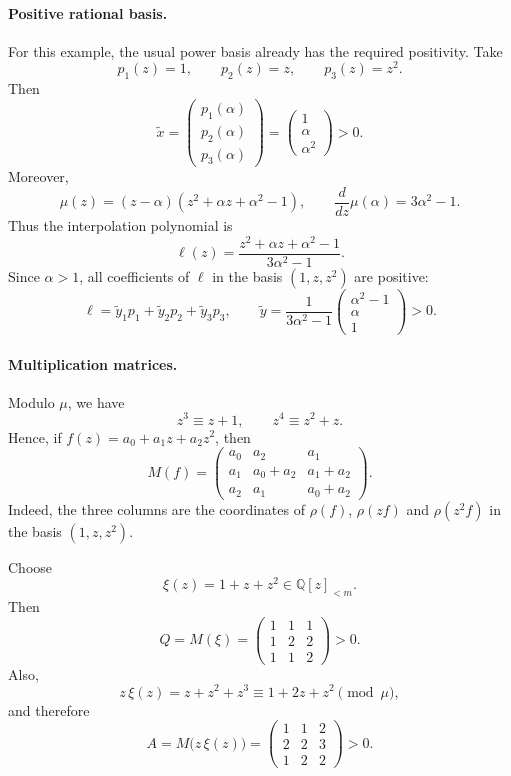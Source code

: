 \documentclass[11pt, a4paper]{article}
\theoremstyle{plain}
\theoremstyle{definition}
\newcommand{\Q}{\mathbb{Q}}
\newcommand{\PQ}{\Q[z]_{<m}}
\begin{document}
\paragraph{Positive rational basis.}
For this example, the usual power basis already has the required positivity. Take
\[
p_1(z)=1,\qquad p_2(z)=z,\qquad p_3(z)=z^2 .
\]
Then
\[
\tilde x=\begin{pmatrix}p_1(\alpha)\\ p_2(\alpha)\\ p_3(\alpha)\end{pmatrix}
=\begin{pmatrix}1\\ \alpha\\ \alpha^2\end{pmatrix}>0 .
\]
Moreover,
\[
\mu(z)=(z-\alpha)(z^2+\alpha z+\alpha^2-1),
\qquad
\frac{d}{dz}\mu(\alpha)=3\alpha^2-1 .
\]
Thus the interpolation polynomial is
\[
\ell(z)=\frac{z^2+\alpha z+\alpha^2-1}{3\alpha^2-1}.
\]
Since $\alpha>1$, all coefficients of $\ell$ in the basis $(1,z,z^2)$ are positive:
\[
\ell=\tilde y_1p_1+\tilde y_2p_2+\tilde y_3p_3,
\qquad
\tilde y=\frac1{3\alpha^2-1}
\begin{pmatrix}
\alpha^2-1\\[2pt]
\alpha\\[2pt]
1
\end{pmatrix}>0 .
\]

\paragraph{Multiplication matrices.}
Modulo $\mu$, we have
\[
z^3\equiv z+1,
\qquad
z^4\equiv z^2+z .
\]
Hence, if $f(z)=a_0+a_1z+a_2z^2$, then
\[
M(f)=
\begin{pmatrix}
a_0 & a_2 & a_1\\
a_1 & a_0+a_2 & a_1+a_2\\
a_2 & a_1 & a_0+a_2
\end{pmatrix}.
\]
Indeed, the three columns are the coordinates of $\rho(f)$, $\rho(zf)$ and $\rho(z^2f)$ in the basis $(1,z,z^2)$.

Choose
\[
\xi(z)=1+z+z^2\in\PQ .
\]
Then
\[
Q=M(\xi)=
\begin{pmatrix}
1&1&1\\
1&2&2\\
1&1&2
\end{pmatrix}>0 .
\]
Also,
\[
z\,\xi(z)=z+z^2+z^3\equiv 1+2z+z^2\pmod{\mu},
\]
and therefore
\[
A=M\bigl(z\,\xi(z)\bigr)=
\begin{pmatrix}
1&1&2\\
2&2&3\\
1&2&2
\end{pmatrix}>0 .
\]
\end{document}
